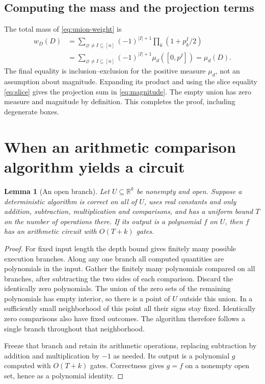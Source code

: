 \documentclass[12pt,a4paper]{article}
\newtheorem{lemma}[theorem]{Lemma}
\theoremstyle{definition}
\theoremstyle{remark}
\newcommand{\R}{\mathbb R}
\begin{document}
\subsection{Computing the mass and the projection terms}

The total mass of \eqref{eq:union-weight} is
\begin{align*}
 w_D(D)
 &=\sum_{\varnothing\ne I\subseteq[n]}(-1)^{|I|+1}
                \prod_k(1+p^I_k/2)\\
 &=\sum_{\varnothing\ne I\subseteq[n]}(-1)^{|I|+1}
                \mu_d([0,p^I])
 =\mu_d(D).
\end{align*}
The final equality is inclusion--exclusion for the positive measure
$\mu_d$, not an assumption about magnitude. Expanding its product
and using the slice equality \eqref{eq:slice} gives the projection sum
in \eqref{eq:magnitude}. The empty union has zero measure and magnitude
by definition. This completes the proof, including degenerate boxes.

\section{When an arithmetic comparison algorithm yields a circuit}
\label{app:branches}

\begin{lemma}[An open branch]
\label{lem:branch}
Let $U\subseteq\R^k$ be nonempty and open. Suppose a deterministic
algorithm is correct on all of $U$, uses real constants and only
addition, subtraction, multiplication and comparisons, and has a
uniform bound $T$ on the number of operations there. If its output is
a polynomial $f$ on $U$, then $f$ has an arithmetic circuit with
$O(T+k)$ gates.
\end{lemma}

\begin{proof}
For fixed input length the depth bound gives finitely many possible
execution branches. Along any one branch all computed quantities are
polynomials in the input. Gather the finitely many polynomials compared
on all branches, after subtracting the two sides of each comparison.
Discard the identically zero polynomials. The union of the zero sets of
the remaining polynomials has empty interior, so there is a point of
$U$ outside this union. In a sufficiently small neighborhood of this
point all their signs stay fixed. Identically zero comparisons also
have fixed outcomes. The algorithm therefore follows a single branch
throughout that neighborhood.

Freeze that branch and retain its arithmetic operations, replacing
subtraction by addition and multiplication by $-1$ as needed. Its output
is a polynomial $g$ computed with $O(T+k)$ gates. Correctness gives
$g=f$ on a nonempty open set, hence as a polynomial identity.
\end{proof}
\end{document}
